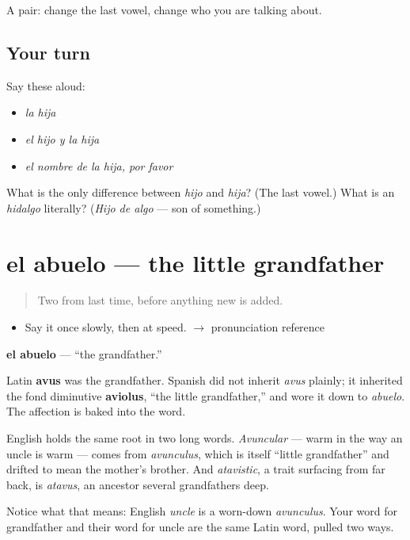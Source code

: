 \begin{grammarlens}[title={What you've built}]
A pair: change the last vowel, change who you are talking about.
\end{grammarlens}

\subsection*{Your turn}
Say these aloud:

\begin{itemize}
\raggedright
  \item \emph{la hija}
  \item \emph{el hijo y la hija}
  \item \emph{el nombre de la hija, por favor}
\end{itemize}

\begin{tcolorbox}[breakable,colback=teal!4,colframe=teal!35!black,title={Before you move on}]
What is the only difference between \emph{hijo} and \emph{hija}? (The last vowel.) What is an \emph{hidalgo} literally? (\emph{Hijo de algo} --- son of something.)
\end{tcolorbox}
\section[el abuelo]{el abuelo --- the little grandfather}

\label{lesson:ES-C306-abuelo}



\begin{quote}
Two from last time, before anything new is added.
\end{quote}

\begin{sounds}
\begin{itemize}
\raggedright
  \item Say it once slowly, then at speed. $\to$ pronunciation reference
\end{itemize}
\end{sounds}

\begin{cousinweb}
\textbf{el abuelo} --- \textquotedblleft{}the grandfather.\textquotedblright{}

Latin \textbf{avus} was the grandfather. Spanish did not inherit \emph{avus} plainly; it inherited the fond diminutive \textbf{aviolus}, \textquotedblleft{}the little grandfather,\textquotedblright{} and wore it down to \emph{abuelo}. The affection is baked into the word.

English holds the same root in two long words. \emph{Avuncular} --- warm in the way an uncle is warm --- comes from \emph{avunculus}, which is itself \textquotedblleft{}little grandfather\textquotedblright{} and drifted to mean the mother's brother. And \emph{atavistic}, a trait surfacing from far back, is \emph{atavus}, an ancestor several grandfathers deep.

Notice what that means: English \emph{uncle} is a worn-down \emph{avunculus}. Your word for grandfather and their word for uncle are the same Latin word, pulled two ways.
\end{cousinweb}

